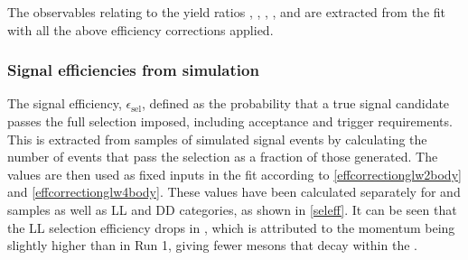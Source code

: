The \CP observables relating to the yield ratios \Rkk, \Rpipi, \Rptwo,  \Rmtwo \Rpipipipi, \Rpfour and  \Rmfour are extracted from the \CP fit with all the above efficiency corrections applied.

\subsubsection{Signal efficiencies from simulation}
\label{sec:cpfit:efficiencies:signal}

The signal efficiency, $\epsilon_{\text{sel}}$, defined as the probability that a true signal candidate passes the full selection imposed, including acceptance and trigger requirements. This is extracted from samples of simulated signal events by calculating the number of events that pass the selection as a fraction of those generated. The values are then used as fixed inputs in the \CP fit according to \eqns\ref{effcorrectionglw2body} and \ref{effcorrectionglw4body}. These values have been calculated separately for \runone and \runtwo samples as well as LL and DD categories, as shown in \tab\ref{seleff}. It can be seen that the LL selection efficiency drops in \runtwo, which is attributed to the \KS momentum being slightly higher than in Run 1, giving fewer \KS mesons that decay within the \velo. 

\begin{table}[h]
\centering
{}
\caption{Summary of the selection efficiencies used in the \CP fit.}
\label{seleff}
\end{table}

